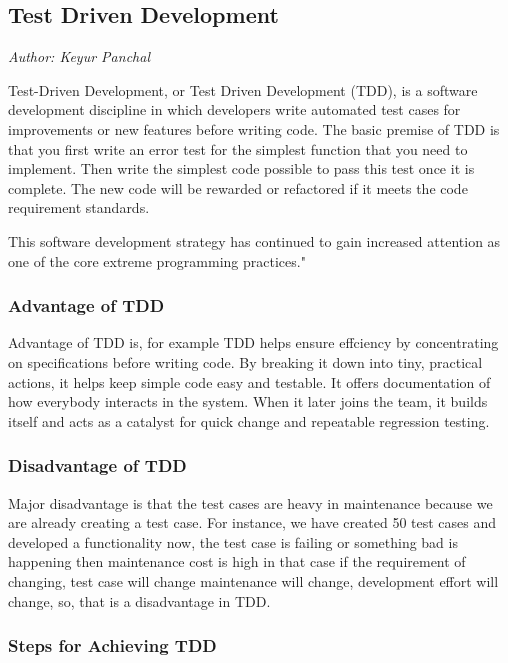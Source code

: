 

\subsection{Test Driven Development}\label{sec:Test Driven Development}

\textit{Author: Keyur Panchal}

Test-Driven Development, or Test Driven Development (TDD), is a software development discipline in which developers write automated test cases for improvements or new features before writing code. The basic premise of TDD is that you first write an error test for the simplest function that you need to implement. Then write the simplest code possible to pass this test once it is complete. The new code will be rewarded or refactored
if it meets the code requirement standards. \par

This software development strategy has continued to gain increased attention as one of the core extreme programming practices." \cite{1510569}

\subsubsection{Advantage of TDD}

Advantage of TDD is, for example TDD helps ensure effciency by concentrating on specifications before writing code. By breaking it down into tiny, practical actions, it helps keep simple code easy and testable. It offers documentation of how everybody interacts in the system. When it later joins the team, it builds itself and acts as a catalyst for quick change and repeatable regression testing.

\subsubsection{Disadvantage of TDD}

Major disadvantage is that the test cases are heavy in maintenance because we are already creating a test case. For instance, we have created 50 test cases and developed a functionality now, the test case is failing or something bad is happening then maintenance cost is high in that case if the requirement of changing, test case will change maintenance will change, development effort will change, so, that is a disadvantage in TDD.


\subsubsection{Steps for Achieving TDD}

